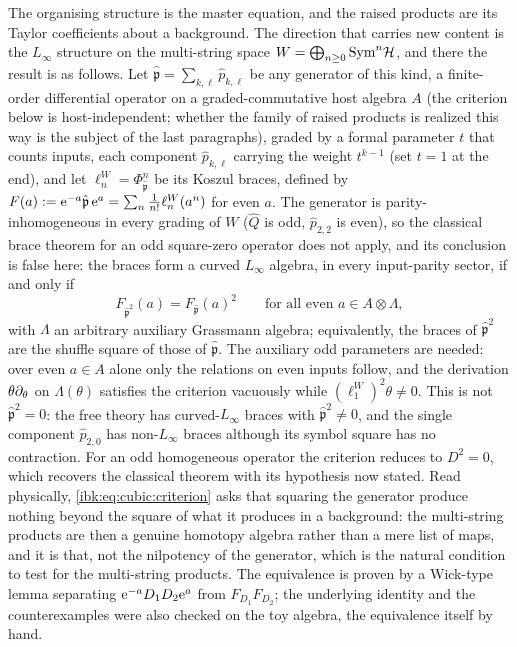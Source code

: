 The organising structure is the master equation, and the raised products are its Taylor coefficients about a background. The direction that carries new content is the $L_\infty$ structure on the multi-string space $W=\bigoplus_{n\ge0}\mathrm{Sym}^n{\mathcal{H}}$, and there the result is as follows. Let $\hat{\mathfrak p}=\sum_{k,\ell}\hat p_{k,\ell}$ be any generator of this kind, a finite-order differential operator on a graded-commutative host algebra $A$ (the criterion below is host-independent; whether the family of raised products is realized this way is the subject of the last paragraphs), graded by a formal parameter $t$ that counts inputs, each component $\hat p_{k,\ell}$ carrying the weight $t^{k-1}$ (set $t=1$ at the end), and let $\ell^W_n=\Phi^n_{\hat{\mathfrak p}}$ be its Koszul braces, defined by $F(a):=\mathrm{e}^{-a}\hat{\mathfrak p}\,\mathrm{e}^{a}=\sum_n\frac1{n!}\ell^W_n(a^n)$ for even $a$. The generator is parity-inhomogeneous in every grading of $W$ ($\hat Q$ is odd, $\hat p_{2,2}$ is even), so the classical brace theorem for an odd square-zero operator does not apply, and its conclusion is false here: the braces form a curved $L_\infty$ algebra, in every input-parity sector, if and only if
\begin{equation}
  \label{ibk:eq:cubic:criterion}
  F_{\hat{\mathfrak p}^2}(a)
    = F_{\hat{\mathfrak p}}(a)^2
  \qquad\text{for all even }a\in A\otimes\Lambda,
\end{equation}
with $\Lambda$ an arbitrary auxiliary Grassmann algebra; equivalently, the braces of $\hat{\mathfrak p}^2$ are the shuffle square of those of $\hat{\mathfrak p}$. The auxiliary odd parameters are needed: over even $a\in A$ alone only the relations on even inputs follow, and the derivation $\theta\partial_\theta$ on $\Lambda(\theta)$ satisfies the criterion vacuously while $(\ell^W_1)^2\theta\neq0$. This is not $\hat{\mathfrak p}^2=0$: the free theory has curved-$L_\infty$ braces with $\hat{\mathfrak p}^2\neq0$, and the single component $\hat p_{2,0}$ has non-$L_\infty$ braces although its symbol square has no contraction. For an odd homogeneous operator the criterion reduces to $D^2=0$, which recovers the classical theorem with its hypothesis now stated. Read physically, \eqref{ibk:eq:cubic:criterion} asks that squaring the generator produce nothing beyond the square of what it produces in a background: the multi-string products are then a genuine homotopy algebra rather than a mere list of maps, and it is that, not the nilpotency of the generator, which is the natural condition to test for the multi-string products. The equivalence is proven by a Wick-type lemma separating $\mathrm{e}^{-a}D_1D_2\mathrm{e}^{a}$ from $F_{D_1}F_{D_2}$; the underlying identity and the counterexamples were also checked on the toy algebra, the equivalence itself by hand.

